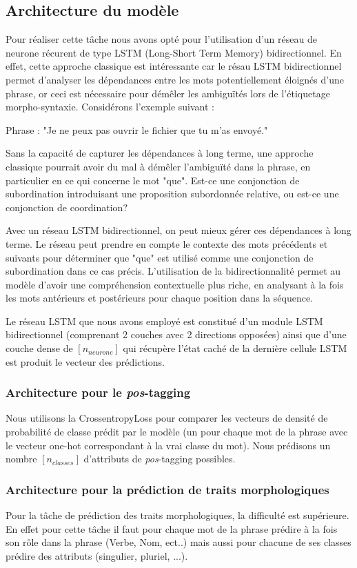\documentclass[a4paper]{article}
\begin{document}
\subsection{Architecture du modèle}
Pour réaliser cette tâche nous avons opté pour l'utilisation d'un réseau de neurone récurent de type LSTM 
(Long-Short Term Memory) bidirectionnel. En effet, cette approche classique est intéressante car le résau 
LSTM bidirectionnel permet d'analyser les dépendances entre les mots potentiellement éloignés d'une phrase, 
or ceci est nécessaire pour démêler les ambiguïtés lors de l'étiquetage morpho-syntaxie. Considérons l'exemple 
suivant :

Phrase : "Je ne peux pas ouvrir le fichier que tu m'as envoyé."

Sans la capacité de capturer les dépendances à long terme, une approche classique pourrait avoir du mal à 
démêler l'ambiguïté dans la phrase, en particulier en ce qui concerne le mot "que". Est-ce une conjonction 
de subordination introduisant une proposition subordonnée relative, ou est-ce une conjonction de coordination?

Avec un réseau LSTM bidirectionnel, on peut mieux gérer ces dépendances à long terme. Le réseau peut prendre 
en compte le contexte des mots précédents et suivants pour déterminer que "que" est utilisé comme une 
conjonction de subordination dans ce cas précis. L'utilisation de la bidirectionnalité permet au modèle 
d'avoir une compréhension contextuelle plus riche, en analysant à la fois les mots antérieurs et postérieurs 
pour chaque position dans la séquence. 

Le réseau LSTM que nous avons employé est constitué d'un module LSTM bidirectionnel (comprenant 2 couches avec 
2 directions opposées) ainsi que d'une couche dense de $[n_{neurone}]$ qui récupère l'état caché de la dernière 
cellule LSTM est produit le vecteur des prédictions. 

\subsubsection{Architecture pour le \textit{pos}-tagging}
Nous utilisons la CrossentropyLoss pour comparer les vecteurs de densité de probabilité de classe prédit par 
le modèle (un pour chaque mot de la phrase avec le vecteur one-hot correspondant à la vrai classe du mot).
Nous prédisons un nombre $[n_{classes}]$ d'attributs de \textit{pos}-tagging possibles. 

\subsubsection{Architecture pour la prédiction de traits morphologiques}
Pour la tâche de prédiction des traits morphologiques, la difficulté est supérieure. En effet pour cette tâche 
il faut pour chaque mot de la phrase prédire à la fois son rôle dans la phrase (Verbe, Nom, ect..) mais aussi 
pour chacune de ses classes prédire des attributs (singulier, pluriel, ...).
\end{document}
